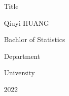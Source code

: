 \thispagestyle{empty} %

\begin{center}

{\LARGE
\begin{doublespace}
Title
\end{doublespace}
}

\Large
\vspace{15ex}
Qiuyi HUANG

\vspace{10ex}
Bachlor of Statistics

\vspace{10ex}

Department 

University

\vspace{10ex}

2022
\end{center}